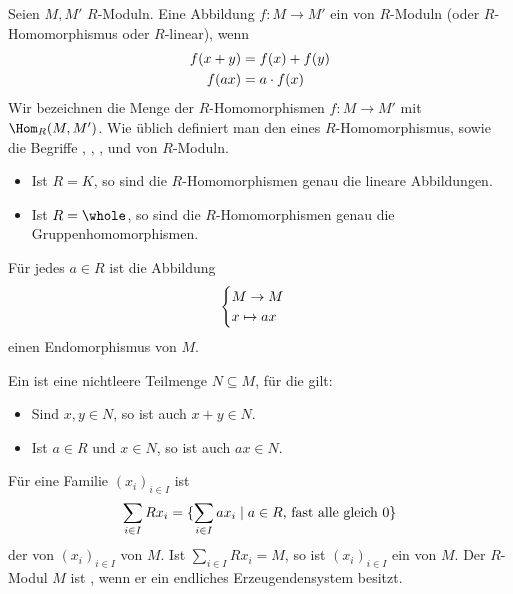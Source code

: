 \begin{definition}
	Seien $M,M'$ $R$-Moduln. Eine Abbildung $f:M\to M'$ ein  von $R$-Moduln (oder $R$-Homomorphismus oder $R$-linear), wenn
	\begin{align}
		f(x+y)&=f(x)+f(y) \notag \\
		f(ax) &= a\cdot f(x)\notag
	\end{align}
	Wir bezeichnen die Menge der $R$-Homomorphismen $f:M\to M'$ mit $\Hom_R(M,M')$. Wie üblich definiert man den  eines $R$-Homomorphismus, sowie die Begriffe , , ,  und  von $R$-Moduln.
\end{definition}

\begin{example}
	\begin{itemize}
		\item Ist $R=K$, so sind die $R$-Homomorphismen genau die lineare Abbildungen.
		\item Ist $R=\whole$, so sind die $R$-Homomorphismen genau die Gruppenhomomorphismen.
	\end{itemize}
\end{example}

\begin{example}
	Für jedes $a\in R$ ist die Abbildung
	\begin{align}
		\begin{cases}
		M\to M \\ x\mapsto ax
		\end{cases}\notag
	\end{align}
	einen Endomorphismus von $M$.
\end{example}

\begin{definition}
	Ein  ist eine nichtleere Teilmenge $N\subseteq M$, für die gilt:
	\begin{itemize}
		\item Sind $x,y\in N$, so ist auch $x+y\in N$.
		\item Ist $a\in R$ und $x\in N$, so ist auch $ax\in N$.
	\end{itemize}

	Für eine Familie $(x_i)_{i\in I}$ ist
	\begin{align}
		\sum_{i\in I} Rx_i=\{\sum_{i\in I} ax_i\mid a\in R\text{, fast alle gleich 0}\}\notag
	\end{align}
	der von $(x_i)_{i\in I}$  von $M$. Ist $\sum_{i\in I} Rx_i=M$, so ist $(x_i)_{i\in I}$ ein  von $M$. Der $R$-Modul $M$ ist , wenn er ein endliches Erzeugendensystem besitzt.
\end{definition}

